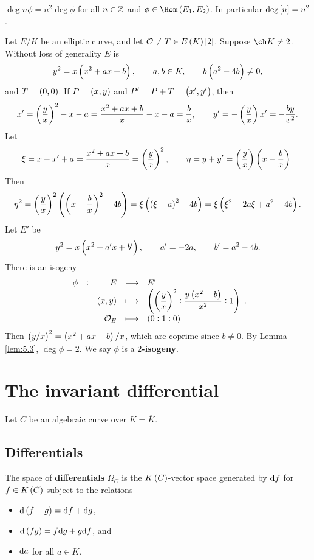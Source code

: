 \begin{corollary}
\label{cor:5.8}
$ \deg n\phi = n^2\deg \phi $ for all $ n \in \mathbb{Z} $ and $ \phi \in \Hom\br{E_1, E_2} $. In particular $ \deg \sbr{n} = n^2 $.
\end{corollary}

\pagebreak

\begin{example}
Let $ E / K $ be an elliptic curve, and let $ \OOO \ne T \in E\br{K}\sbr{2} $. Suppose $ \ch K \ne 2 $. Without loss of generality $ E $ is
$$ y^2 = x\br{x^2 + ax + b}, \qquad a, b \in K, \qquad b\br{a^2 - 4b} \ne 0, $$
and $ T = \br{0, 0} $. If $ P = \br{x, y} $ and $ P' = P + T = \br{x', y'} $, then
$$ x' = \br{\dfrac{y}{x}}^2 - x - a = \dfrac{x^2 + ax + b}{x} - x - a = \dfrac{b}{x}, \qquad y' = -\br{\dfrac{y}{x}}x' = -\dfrac{by}{x^2}. $$
Let
$$ \xi = x + x' + a = \dfrac{x^2 + ax + b}{x} = \br{\dfrac{y}{x}}^2, \qquad \eta = y + y' = \br{\dfrac{y}{x}}\br{x - \dfrac{b}{x}}. $$
Then
$$ \eta^2 = \br{\dfrac{y}{x}}^2\br{\br{x + \dfrac{b}{x}}^2 - 4b} = \xi\br{\br{\xi - a}^2 - 4b} = \xi\br{\xi^2 - 2a\xi + a^2 - 4b}. $$
Let $ E' $ be
$$ y^2 = x\br{x^2 + a'x + b'}, \qquad a' = -2a, \qquad b' = a^2 - 4b. $$
There is an isogeny
$$ \functions[\phi]{E}{E'}{\br{x, y}}{\br{\br{\dfrac{y}{x}}^2 : \dfrac{y\br{x^2 - b}}{x^2} : 1}}{\OOO_E}{\br{0 : 1 : 0}}. $$
Then $ \br{y / x}^2 = \br{x^2 + ax + b} / x $, which are coprime since $ b \ne 0 $. By Lemma \ref{lem:5.3}, $ \deg \phi = 2 $. We say $ \phi $ is a \textbf{$ 2 $-isogeny}.
\end{example}

\pagebreak

\section{The invariant differential}


Let $ C $ be an algebraic curve over $ K = \overline{K} $.

\subsection{Differentials}

\begin{definition*}
The space of \textbf{differentials} $ \Omega_C $ is the $ K\br{C} $-vector space generated by $ \mathrm{d} f $ for $ f \in K\br{C} $ subject to the relations
\begin{itemize}
\item $ \d\br{f + g} = \d f + \d g $,
\item $ \d\br{fg} = f\d g + g\d f $, and
\item $ \mathrm{d} a $ for all $ a \in K $.
\end{itemize}
\end{definition*}

